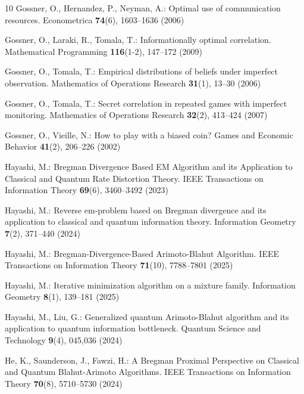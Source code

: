 \documentclass[smallextended,referee,envcountsect,]{svjour3}
\begin{document}
\begin{thebibliography}{10}
Gossner, O., Hernandez, P., Neyman, A.: Optimal use of communication resources.
\newblock Econometrica \textbf{74}(6), 1603--1636 (2006)

Gossner, O., Laraki, R., Tomala, T.: Informationally optimal correlation.
\newblock Mathematical Programming \textbf{116}(1-2), 147--172 (2009)

Gossner, O., Tomala, T.: Empirical distributions of beliefs under imperfect
  observation.
\newblock Mathematics of Operations Research \textbf{31}(1), 13--30
  (2006)

Gossner, O., Tomala, T.: Secret correlation in repeated games with imperfect
  monitoring.
\newblock Mathematics of Operations Research \textbf{32}(2), 
413--424
  (2007)

Gossner, O., Vieille, N.: How to play with a biased coin?
\newblock Games and Economic Behavior \textbf{41}(2), 206--226 (2002)

Hayashi, M.: {{B}regman Divergence Based {EM} Algorithm and its Application to
  Classical and Quantum Rate Distortion Theory}.
\newblock IEEE Transactions on Information Theory \textbf{69}(6), 3460--3492
  (2023)

Hayashi, M.: {Reverse em-problem based on {B}regman divergence and its
  application to classical and quantum information theory}.
\newblock Information Geometry \textbf{7}(2), 371--440 (2024)

Hayashi, M.: {{B}regman-Divergence-Based {A}rimoto-{B}lahut Algorithm}.
\newblock IEEE Transactions on Information Theory \textbf{71}(10), 7788--7801
  (2025)

Hayashi, M.: {Iterative minimization algorithm on a mixture family}.
\newblock Information Geometry \textbf{8}(1), 139--181 (2025)

Hayashi, M., Liu, G.: {Generalized quantum {A}rimoto-{B}lahut algorithm and its
  application to quantum information bottleneck}.
\newblock Quantum Science and Technology \textbf{9}(4), 045,036 (2024)

He, K., Saunderson, J., Fawzi, H.: {A {B}regman Proximal Perspective on
  Classical and Quantum {B}lahut-{A}rimoto Algorithms}.
\newblock IEEE Transactions on Information Theory \textbf{70}(8), 5710--5730
  (2024)


\end{thebibliography}
\end{document}
